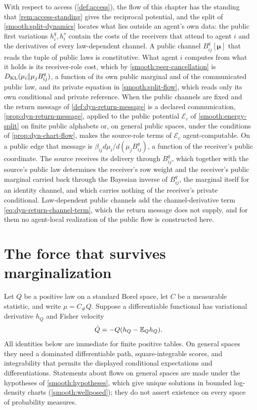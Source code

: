 With respect to access (\cref{def:access}), the flow of this chapter has the standing that \cref{rem:access-standing} gives the reciprocal potential, and the split of \cref{smooth:split-dynamics} locates what lies outside an agent's own data: the public first variations $h_i^q,h_i^s$ contain the costs of the receivers that attend to agent $i$ and the derivatives of every law-dependent channel. A public channel $B_{ij}^q[\boldsymbol\mu]$ that reads the tuple of public laws is constitutive. What agent $i$ computes from what it holds is its receiver-role cost, which by \cref{smooth:peer-cancellation} is $D_{\mathrm{KL}}(\mu_i\Vert\mu_jB_{ij}^q)$, a function of its own public marginal and of the communicated public law, and its private equation in \cref{smooth:split-flow}, which reads only its own conditional and private reference. When the public channels are fixed and the return message of \cref{def:dyn-return-message} is a declared communication, \cref{prop:dyn-return-message}, applied to the public potential $\mathcal E_c$ of \cref{smooth:energy-split} on finite public alphabets or, on general public spaces, under the conditions of \cref{prop:dyn-chart-flow}, makes the source-role terms of $\mathcal E_c$ agent-computable. On a public edge that message is $\beta_{ij}d\mu_i/d(\mu_jB_{ij}^q)$, a function of the receiver's public coordinate. The source receives its delivery through $B_{ij}^q$, which together with the source's public law determines the receiver's row weight and the receiver's public marginal carried back through the Bayesian inverse of $B_{ij}^q$, the marginal itself for an identity channel, and which carries nothing of the receiver's private conditional. Law-dependent public channels add the channel-derivative term \cref{eq:dyn-return-channel-term}, which the return message does not supply, and for them no agent-local realization of the public flow is constructed here.

\section{The force that survives marginalization}

Let $Q$ be a positive law on a standard Borel space, let $C$ be a measurable statistic, and write $\mu=C_\#Q$. Suppose a differentiable functional has variational derivative $h_Q$ and Fisher velocity
\begin{equation}
 \dot Q=-Q(h_Q-\mathbb E_Qh_Q).
 \label{smooth:fine-score}
\end{equation}
All identities below are immediate for finite positive tables. On general spaces they need a dominated differentiable path, square-integrable scores, and integrability that permits the displayed conditional expectations and differentiations. Statements about flows on general spaces are made under the hypotheses of \cref{smooth:hypotheses}, which give unique solutions in bounded log-density charts (\cref{smooth:wellposed}); they do not assert existence on every space of probability measures.


